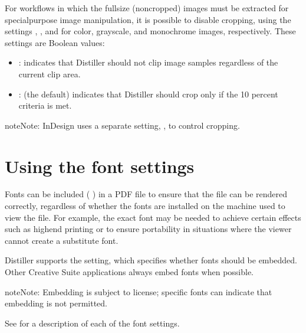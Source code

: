 \documentclass[letterpaper,12pt,english,openany,oneside]{sphinxmanual}
\begin{document}
For workflows in which the full\sphinxhyphen{}size (non\sphinxhyphen{}cropped) images must be extracted for special\sphinxhyphen{}purpose image manipulation, it is possible to disable cropping, using the settings  ,  , and  for color, grayscale, and monochrome images, respectively. These settings are Boolean values:
\begin{itemize}
\item {} 
 : indicates that Distiller should not clip image samples regardless of the current clip area.

\item {} 
 : (the default) indicates that Distiller should crop only if the 10 percent criteria is met.

\end{itemize}

\begin{sphinxadmonition}{note}{Note:}
InDesign uses a separate setting,  , to control cropping.
\end{sphinxadmonition}




\section{Using the font settings}
\label{\detokenize{PDF_Create_UsingSettings:using-the-font-settings}}
Fonts can be included (  ) in a PDF file to ensure that the file can be rendered correctly, regardless of whether the fonts are installed on the machine used to view the file. For example, the exact font may be needed to achieve certain effects such as high\sphinxhyphen{}end printing or to ensure portability in situations where the viewer cannot create a substitute font.

Distiller supports the  setting, which specifies whether fonts should be embedded. Other Creative Suite applications always embed fonts when possible.

\begin{sphinxadmonition}{note}{Note:}
Embedding is subject to license; specific fonts can indicate that embedding is not permitted.
\end{sphinxadmonition}

See  for a description of each of the font settings.
\end{document}
